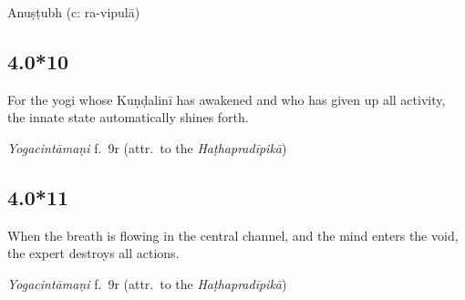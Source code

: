 \begin{ekdosis}
\begin{metre}[hp04_000_9]
Anuṣṭubh (c: ra-vipulā)
\end{metre}

\subsection*{4.0*10}
\begin{translation}[hp04_000_10]
For the yogi whose Kuṇḍalinī has awakened and who has given up all activity, the innate state automatically shines forth.
\end{translation}


\begin{testimonia}[hp04_000_10]
\emph{Yogacintāmaṇi} f.~9r (attr.~to the \emph{Haṭhapradīpikā})
\begin{versinnote}
\end{versinnote}
\end{testimonia}


%

\subsection*{4.0*11}
\begin{translation}[hp04_000_11]
When the breath is flowing in the central channel, and the mind enters the void, the expert destroys all actions.
\end{translation}


\begin{testimonia}[hp04_000_11]
\emph{Yogacintāmaṇi} f.~9r (attr.~to the \emph{Haṭhapradīpikā})
\begin{versinnote}
\end{versinnote}


\end{testimonia}
\end{ekdosis}
